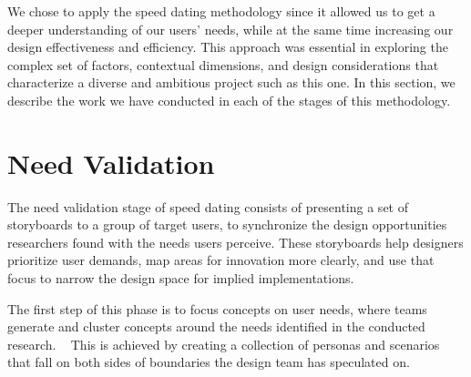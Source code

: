 We chose to apply the speed dating methodology since it allowed us to get a deeper understanding of our users' needs, while at the same time increasing our design effectiveness and efficiency. This approach was essential in exploring the complex set of factors, contextual dimensions, and design considerations that characterize a diverse and ambitious project such as this one. In this section, we describe the work we have conducted in each of the stages of this methodology.

\section{Need Validation}

The need validation stage of speed dating consists of presenting a set of storyboards to a group of target users, to synchronize the design opportunities researchers found with the needs users perceive. These storyboards help designers prioritize user demands, map areas for innovation more clearly, and use that focus to narrow the design space for implied implementations. ~\cite{Davidoff2007}

The first step of this phase is to focus concepts on user needs, where teams generate and cluster concepts around the needs identified in the conducted research. ~\cite{Davidoff2007} This is achieved by creating a collection of personas and scenarios that fall on both sides of boundaries the design team has speculated on. 

